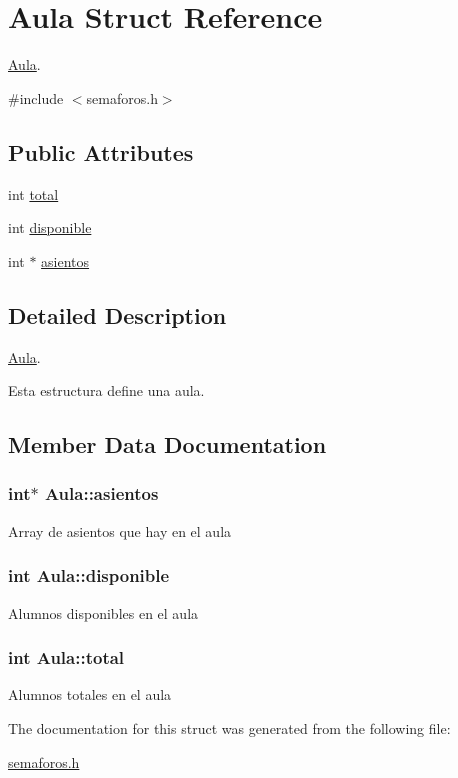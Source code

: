 \hypertarget{structAula}{\section{Aula Struct Reference}
\label{structAula}
}


\hyperlink{structAula}{Aula}.  




{\ttfamily \#include $<$semaforos.\+h$>$}

\subsection*{Public Attributes}
\begin{DoxyCompactItemize}
\item 
int \hyperlink{structAula_ae4aae9af9f7e5b4263f28724b7cf6b41}{total}
\item 
int \hyperlink{structAula_afab45e2d1b58e6fea3def2c580383761}{disponible}
\item 
int $\ast$ \hyperlink{structAula_a1622f12eff003c23e883fb4b89c051e1}{asientos}
\end{DoxyCompactItemize}


\subsection{Detailed Description}
\hyperlink{structAula}{Aula}. 

Esta estructura define una aula. 

\subsection{Member Data Documentation}
\hypertarget{structAula_a1622f12eff003c23e883fb4b89c051e1}{
\subsubsection[{asientos}]{\setlength{\rightskip}{0pt plus 5cm}int$\ast$ Aula\+::asientos}}\label{structAula_a1622f12eff003c23e883fb4b89c051e1}
Array de asientos que hay en el aula \hypertarget{structAula_afab45e2d1b58e6fea3def2c580383761}{
\subsubsection[{disponible}]{\setlength{\rightskip}{0pt plus 5cm}int Aula\+::disponible}}\label{structAula_afab45e2d1b58e6fea3def2c580383761}
Alumnos disponibles en el aula \hypertarget{structAula_ae4aae9af9f7e5b4263f28724b7cf6b41}{
\subsubsection[{total}]{\setlength{\rightskip}{0pt plus 5cm}int Aula\+::total}}\label{structAula_ae4aae9af9f7e5b4263f28724b7cf6b41}
Alumnos totales en el aula 

The documentation for this struct was generated from the following file\+:\begin{DoxyCompactItemize}
\item 
\hyperlink{semaforos_8h}{semaforos.\+h}\end{DoxyCompactItemize}
